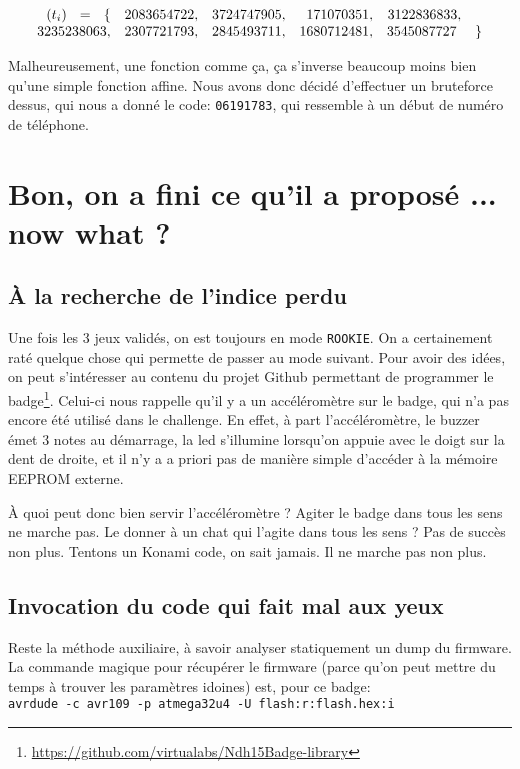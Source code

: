 \documentclass[11pt]{article}
\newcommand{\ttt}[1]{\texttt{#1}}
\begin{document}
\[
\begin{array}{crrrrrl}
\hfill (t_i) \hfill = \hfill\{& 2083654722,& 3724747905,& 171070351,& 3122836833,&\\
3235238063, &2307721793,& 2845493711,& 1680712481,& 3545087727\ &\}
\end{array}
\]

Malheureusement, une fonction comme ça, ça s'inverse beaucoup moins bien qu'une simple fonction affine. Nous avons donc décidé d'effectuer un bruteforce dessus, qui nous a donné le code: \ttt{06191783}, qui ressemble à un début de numéro de téléphone.

  \section{Bon, on a fini ce qu'il a proposé ... now what ?}

    \subsection{À la recherche de l'indice perdu}

    Une fois les 3 jeux validés, on est toujours en mode \ttt{ROOKIE}. On a certainement raté quelque chose qui permette de passer au mode suivant. Pour avoir des idées, on peut s'intéresser au contenu du projet Github permettant de programmer le badge\footnote{\url{https://github.com/virtualabs/Ndh15Badge-library}}. Celui-ci nous rappelle qu'il y a un accéléromètre sur le badge, qui n'a pas encore été utilisé dans le challenge. En effet, à part l'accéléromètre, le buzzer émet 3 notes au démarrage, la led s'illumine lorsqu'on appuie avec le doigt sur la dent de droite, et il n'y a a priori pas de manière simple d'accéder à la mémoire EEPROM externe.

    À quoi peut donc bien servir l'accéléromètre ? Agiter le badge dans tous les sens ne marche pas. Le donner à un chat qui l'agite dans tous les sens ? Pas de succès non plus. Tentons un Konami code, on sait jamais. Il ne marche pas non plus.

    \subsection{Invocation du code qui fait mal aux yeux}

    Reste la méthode auxiliaire, à savoir analyser statiquement un dump du firmware. La commande magique pour récupérer le firmware (parce qu'on peut mettre du temps à trouver les paramètres idoines) est, pour ce badge: \\
  \ttt{avrdude -c avr109 -p atmega32u4 -U flash:r:flash.hex:i}
\end{document}
